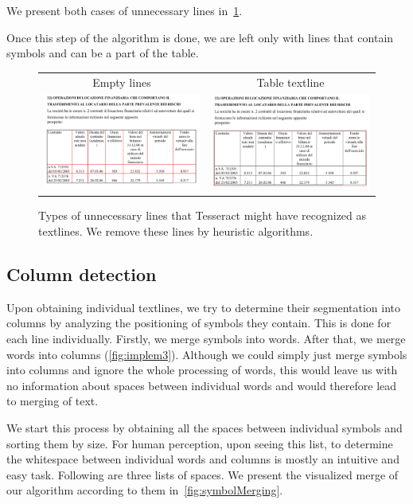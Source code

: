 We present both cases of unnecessary lines in~\cref{fig:deletionOfLines}.

Once this step of the algorithm is done, we are left only with lines that contain symbols and can be a part of the table.

\begin{figure}
\centering
{\sffamily
\begin{tabular}{cc}
Empty lines & Table textline \\
\includegraphics[width=0.4\linewidth]{img/implementation/textlineEmpty.png}
&
\includegraphics[width=0.4\linewidth]{img/implementation/textlineTable.png}\\
\end{tabular}
}
\caption{Types of unnecessary lines that Tesseract might have recognized as textlines. We remove these lines by heuristic algorithms.}
\label{fig:deletionOfLines}
\end{figure}

\subsection{Column detection} \label{columnDetection}

Upon obtaining individual textlines, we try to determine their segmentation into columns by analyzing the positioning of symbols they contain. This is done for each line individually. Firstly, we merge symbols into words. After that, we merge words into columns (\cref{fig:implem3}). Although we could simply just merge symbols into columns and ignore the whole processing of words, this would leave us with no information about spaces between individual words and would therefore lead to merging of text.

We start this process by obtaining all the spaces between individual symbols and sorting them by size. For human perception, upon seeing this list, to determine the whitespace between individual words and columns is mostly an intuitive and easy task. Following are three lists of spaces. We present the visualized merge of our algorithm according to them in~\cref{fig:symbolMerging}.

